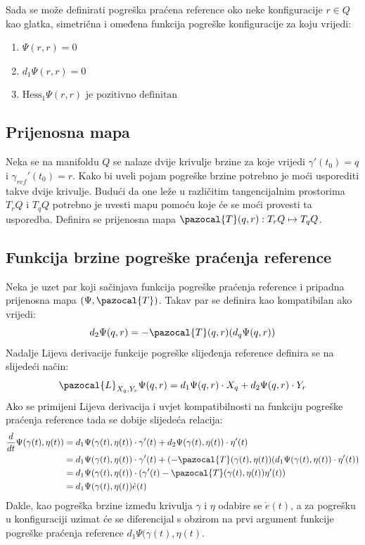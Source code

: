 \documentclass[times, utf8, diplomski, numeric]{fer}
\newcommand{\Ta}{\pazocal{T}}
\newcommand{\La}{\pazocal{L}}
\begin{document}
	\newpage
	\clearpage
	Sada se može definirati pogreška praćena reference oko neke konfiguracije $r\in Q$ kao glatka, simetrična i omeđena funkcija pogreške konfiguracije za koju vrijedi: 
	\begin{enumerate}
		\item $\Psi(r,r)=0$
		
		\item $d_1 \Psi(r, r) = 0$
		
		\item $\text{Hess}_1\Psi (r, r)\text{ je pozitivno definitan}$
	\end{enumerate}
	
	\subsection{Prijenosna mapa} Neka se na manifoldu $Q$ se nalaze dvije krivulje brzine za koje vrijedi $\gamma'(t_0)=q$ i $\gamma_{ref}'(t_0)=r$. Kako bi uveli pojam pogreške brzine potrebno je moći usporediti takve dvije krivulje. Budući da one leže u različitim tangencijalnim prostorima $T_r Q$ i $T_q Q$ potrebno je uvesti mapu pomoću koje će se moći provesti ta usporedba. Definira se prijenosna mapa $\Ta(q,r): T_r Q \mapsto T_q Q$.
	
	\subsection{Funkcija brzine pogreške praćenja reference} Neka je uzet par koji sačinjava funkcija pogreške praćenja reference i pripadna prijenosna mapa $(\Psi, \Ta)$. Takav par se definira kao kompatibilan ako vrijedi:
	\begin{equation}
		d_2\Psi(q,r) = - \Ta(q,r)(d_q\Psi(q,r))
	\end{equation}
	\noindent Nadalje Lijeva derivacije funkcije pogreške slijeđenja reference definira se na slijedeći način:
	\begin{equation}
		\La_{X_q, Y_r}\Psi(q,r) = d_1\Psi(q,r) \cdot X_q + d_2\Psi(q,r) \cdot Y_r
	\end{equation}
	\noindent Ako se primijeni Lijeva derivacija i uvjet kompatibilnosti na funkciju pogreške praćenja reference tada se dobije slijedeća relacija:
	\begin{align}
		\frac{d}{dt} \Psi(\gamma(t), \eta(t)) &= d_1\Psi(\gamma(t), \eta(t)) \cdot \gamma '(t) + d_2\Psi(\gamma(t), \eta(t)) \cdot \eta ' (t)\\
		&= d_1\Psi(\gamma(t), \eta(t)) \cdot \gamma '(t) + (- \Ta(\gamma(t), \eta(t))(d_1\Psi(\gamma(t), \eta(t)) \cdot \eta'(t)) \\
		&= d_1\Psi(\gamma(t), \eta(t)) \cdot (\gamma '(t) - \Ta(\gamma(t), \eta(t))\eta'(t)) \label{error}\\
		&= d_1\Psi(\gamma(t), \eta(t)) \dot{e}(t)
	\end{align}
	Dakle, kao pogreška brzine između krivulja $\gamma$ i $\eta$ odabire se $\dot{e}(t)$, a za pogrešku u konfiguraciji uzimat će se diferencijal s obzirom na prvi argument funkcije pogreške praćenja reference $d_1\Psi(\gamma(t), \eta(t)$.
	
\end{document}
